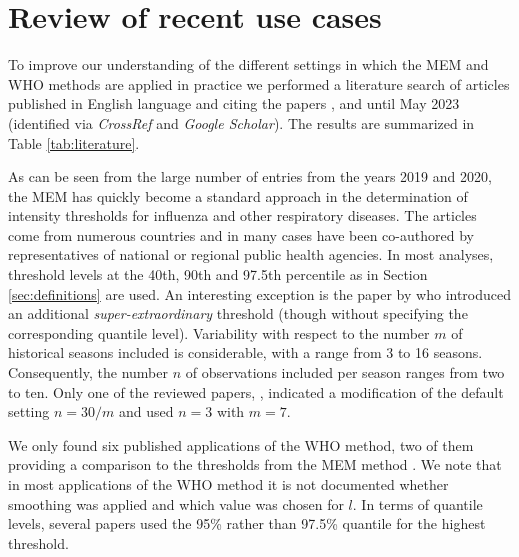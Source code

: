 \documentclass{article}
\begin{document}


\section{Review of recent use cases}
\label{sec:review}

To improve our understanding of the different settings in which the MEM and WHO methods are applied in practice we performed a literature search of articles published in English language and citing the papers \cite{Vega2015}, \cite{WHO2014} and \cite{WHO2017} until May 2023 (identified via \textit{CrossRef} and \textit{Google Scholar}). The results are summarized in Table \ref{tab:literature}.

As can be seen from the large number of entries from the years 2019 and 2020, the MEM has quickly become a standard approach in the determination of intensity thresholds for influenza and other respiratory diseases. The articles come from numerous countries and in many cases have been co-authored by representatives of national or regional public health agencies. In most analyses, threshold levels at the 40th, 90th and 97.5th percentile as in Section \ref{sec:definitions} are used. An interesting exception is the paper by \cite{Domegan2022} who introduced an additional \textit{super-extraordinary} threshold (though without specifying the corresponding quantile level). Variability with respect to the number $m$ of historical seasons included is considerable, with a range from 3 to 16 seasons. Consequently, the number $n$ of observations included per season ranges from two to ten. Only one of the reviewed papers, \cite{Dahlgren2022}, indicated a modification of the default setting $n = 30/m$  and used $n = 3$ with $m = 7$.

We only found six published applications of the WHO method, two of them providing a comparison to the thresholds from the MEM method \citep{Rguig2020, Teeluck2021}. We note that in most applications of the WHO method it is not documented whether smoothing was applied and which value was chosen for $l$. In terms of quantile levels, several papers used the 95\% rather than 97.5\% quantile for the highest threshold.
\end{document}
